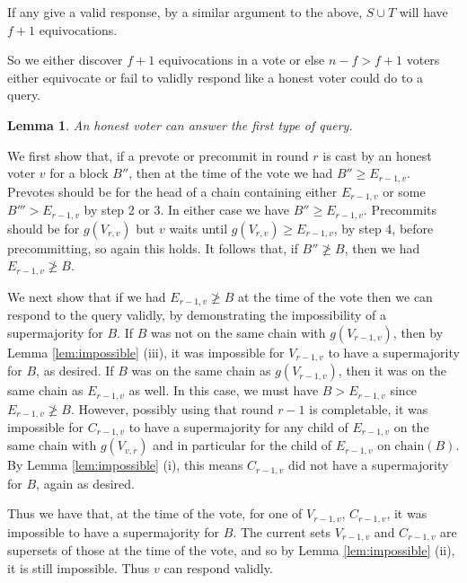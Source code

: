 \documentclass{article}
\newtheorem{lemma}[theorem]{Lemma}
\begin{document}
If any give a valid response, by a similar argument to the above, $S \cup T$ will have $f+1$ equivocations.

So we either discover $f+1$ equivocations in a vote or else $n-f > f+1$ voters either equivocate or fail to validly respond like a honest voter could do to a query.


\begin{lemma} \label{lem:honest-answer}
An honest voter can answer the first type of query.
\end{lemma}
We first show that, if a prevote or precommit in round $r$ is cast by an honest voter $v$ for a block $B''$, then at the time of the vote we had $B'' \geq E_{r-1,v}$.
Prevotes should be for the head of a chain containing either $E_{r-1,v}$ or some $B''' > E_{r-1,v}$ by step 2 or 3.  In either case we have $B'' \geq E_{r-1,v}$. Precommits should be for $g(V_{r,v})$ but $v$ waits until $g(V_{r,v}) \geq E_{r-1,v}$, by step 4, before precommitting, so again this holds.
It follows that, if $B'' \not\geq B$, then we had $E_{r-1,v} \not\geq B$.

We next show that if we had $E_{r-1,v} \not\geq B$ at the time of the vote then we can respond to the query validly, by demonstrating the impossibility of a supermajority for $B$. 
If $B$ was not on the same chain with $g(V_{r-1,v})$, then by Lemma \ref{lem:impossible} (iii), it was impossible for $V_{r-1,v}$ to have a supermajority for $B$, as desired. 
If $B$ was on the same chain as $g(V_{r-1,v})$, then it was on the same chain as $E_{r-1,v}$ as well.  In this case, we must have $B > E_{r-1,v}$ since $E_{r-1,v} \not\geq B$.
 However, possibly using that round $r-1$ is completable, it was impossible for $C_{r-1,v}$ to have a supermajority for any child of $E_{r-1,v}$ on the same chain with $g(V_{v,r})$ and in particular for the child of $E_{r-1,v}$ on $\textrm{chain}(B)$.
By Lemma \ref{lem:impossible} (i), this means $C_{r-1,v}$ did not have a supermajority for $B$, again as desired.

Thus we have that, at the time of the vote, for one of $V_{r-1,v}$, $C_{r-1,v}$, it was impossible to have a supermajority for $B$. The current sets $V_{r-1,v}$ and $C_{r-1,v}$ are supersets of those at the time of the vote, and so by Lemma \ref{lem:impossible} (ii), it is still impossible. Thus $v$ can respond validly.
\end{document}
